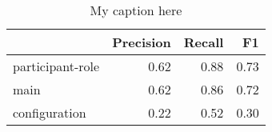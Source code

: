 \begin{table}[!ht]
\centering
\begin{tabular}{lrrr}
\toprule
{} &  Precision &  Recall &   F1 \\
\midrule
participant-role &       0.62 &    0.88 & 0.73 \\
main             &       0.62 &    0.86 & 0.72 \\
configuration    &       0.22 &    0.52 & 0.30 \\
\bottomrule
\end{tabular}
\caption{My caption here}
\label{tab:unit-elements-transitivity-exact-F1}
\end{table}